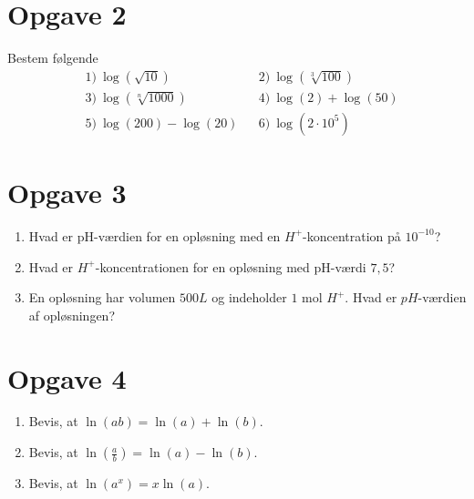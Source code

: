 \section*{Opgave 2}
Bestem følgende 
\begin{align*}
&1) \ \log(\sqrt{10})    &&2) \  \log(\sqrt[3]{100})  \\
&3) \ \log(\sqrt[n]{1000})   &&4) \ \log(2) + \log(50)    \\
&5) \ \log(200)-\log(20)   &&6) \ \log(2\cdot 10^5)   
\end{align*}
\section*{Opgave 3}
\begin{enumerate}[label=\roman*)]
\item Hvad er pH-værdien for en opløsning med en $H^+$-koncentration på $10^{-10}$?
\item Hvad er $H^+$-koncentrationen for en opløsning med pH-værdi $7,5$?
\item En opløsning har volumen $500L$ og indeholder $1$ mol $H^+$. Hvad er $pH$-værdien af opløsningen?
\end{enumerate}
\section*{Opgave 4}
\begin{enumerate}[label=\roman*)]
\item Bevis, at  $\ln(ab) = \ln(a)+\ln(b).$
\item Bevis, at  $\ln(\frac{a}{b}) = \ln(a)-\ln(b)$.
\item Bevis, at  $\ln(a^x) = x\ln(a)$.
\end{enumerate}